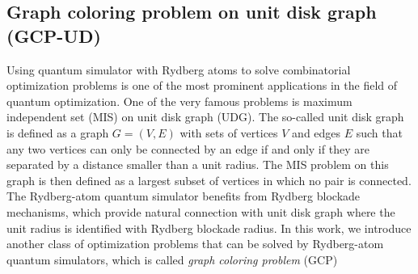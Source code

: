\documentclass[%
 reprint,
nofootinbib,
 amsmath,amssymb,
 aps,
pra,
floatfix,
]{revtex4-2}
\begin{document}
 
\subsection{Graph coloring problem on unit disk graph (GCP-UD)}

Using quantum simulator with Rydberg atoms to solve combinatorial optimization problems is one of the most prominent applications in the field of quantum optimization. One of the very famous problems is maximum independent set (MIS) on unit disk graph (UDG). The so-called unit disk graph is defined as a graph $G=(V,E)$ with sets of vertices $V$ and edges $E$ such that any two vertices can only be connected by an edge if and only if they are separated by a distance smaller than a unit radius. The MIS problem on this graph is then defined as a largest subset of vertices in which no pair is connected. The Rydberg-atom quantum simulator benefits from Rydberg blockade mechanisms, which provide natural connection with unit disk graph where the unit radius is identified with Rydberg blockade radius. In this work, we introduce another class of optimization problems that can be solved by Rydberg-atom quantum simulators, which is called \emph{graph coloring problem} (GCP) \\
\end{document}
